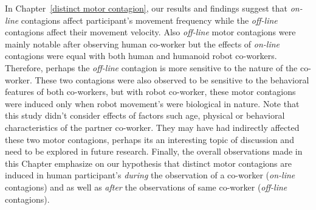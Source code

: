In Chapter~\ref{distinct motor contagion}, our results and findings suggest that \textit{on-line} contagions affect participant's movement frequency while the \textit{off-line} contagions affect their movement velocity. Also \textit{off-line} motor contagions were mainly notable after observing human co-worker but the effects of \textit{on-line} contagions were equal with both human and humanoid robot co-workers. Therefore, perhaps the \textit{off-line} contagion is more sensitive to the nature of the co-worker. These two contagions were also observed to be sensitive to the behavioral features of both co-workers, but with robot co-worker, these motor contagions were induced only when robot movement's were biological in nature. Note that this study didn't consider effects of factors such age, physical or behavioral characteristics of the partner co-worker. They may have had indirectly affected these two motor contagions, perhaps its an interesting topic of discussion and need to be explored in future research. Finally, the overall observations made in this Chapter emphasize on our hypothesis that distinct motor contagions are induced in human participant's \emph{during} the observation of a co-worker (\textit{on-line} contagions) and as well as \emph{after} the observations of same co-worker (\textit{off-line} contagions).


